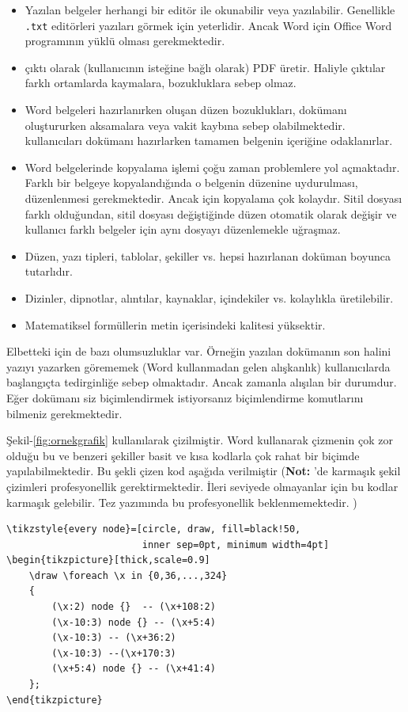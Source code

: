 \begin{itemize}
    \item Yazılan belgeler herhangi bir editör ile okunabilir veya yazılabilir. Genellikle \texttt{.txt} editörleri yazıları görmek için yeterlidir. Ancak Word için Office Word programının yüklü olması gerekmektedir.
    \item \latex çıktı olarak (kullanıcının isteğine bağlı olarak) PDF üretir. Haliyle çıktılar farklı ortamlarda kaymalara, bozukluklara sebep olmaz. 
    \item Word belgeleri hazırlanırken oluşan düzen bozuklukları, dokümanı oluştururken aksamalara veya vakit kaybına sebep olabilmektedir. \latex kullanıcıları dokümanı hazırlarken tamamen belgenin içeriğine odaklanırlar.
    \item Word belgelerinde kopyalama işlemi çoğu zaman problemlere yol açmaktadır. Farklı bir belgeye kopyalandığında o belgenin düzenine uydurulması, düzenlenmesi gerekmektedir. Ancak \latex için kopyalama çok kolaydır. Sitil dosyası farklı olduğundan, sitil dosyası değiştiğinde düzen otomatik olarak değişir ve kullanıcı farklı belgeler için aynı dosyayı düzenlemekle uğraşmaz.
    \item Düzen, yazı tipleri, tablolar, şekiller vs. hepsi hazırlanan doküman boyunca tutarlıdır.
    \item Dizinler, dipnotlar, alıntılar, kaynaklar, içindekiler vs. kolaylıkla üretilebilir.
    \item Matematiksel formüllerin metin içerisindeki kalitesi yüksektir.
\end{itemize}

Elbetteki \latex için de bazı olumsuzluklar var. Örneğin yazılan dokümanın son halini yazıyı yazarken görememek (Word kullanmadan gelen alışkanlık) kullanıcılarda başlangıçta tedirginliğe sebep olmaktadır. Ancak zamanla alışılan bir durumdur. Eğer dokümanı siz biçimlendirmek istiyorsanız biçimlendirme komutlarını bilmeniz gerekmektedir. 

Şekil-\ref{fig:ornekgrafik} \latex kullanılarak çizilmiştir. Word kullanarak çizmenin çok zor olduğu bu ve benzeri şekiller basit ve kısa kodlarla çok rahat bir biçimde yapılabilmektedir. Bu şekli çizen kod aşağıda verilmiştir (\textbf{Not:} \latexx'de karmaşık şekil çizimleri profesyonellik gerektirmektedir. İleri seviyede olmayanlar için bu kodlar karmaşık gelebilir. Tez yazımında bu profesyonellik beklenmemektedir. )

\begin{verbatim}
\tikzstyle{every node}=[circle, draw, fill=black!50,
                        inner sep=0pt, minimum width=4pt]
\begin{tikzpicture}[thick,scale=0.9]
    \draw \foreach \x in {0,36,...,324}
    {
        (\x:2) node {}  -- (\x+108:2)
        (\x-10:3) node {} -- (\x+5:4)
        (\x-10:3) -- (\x+36:2)
        (\x-10:3) --(\x+170:3)
        (\x+5:4) node {} -- (\x+41:4)
    };
\end{tikzpicture}
\end{verbatim}

